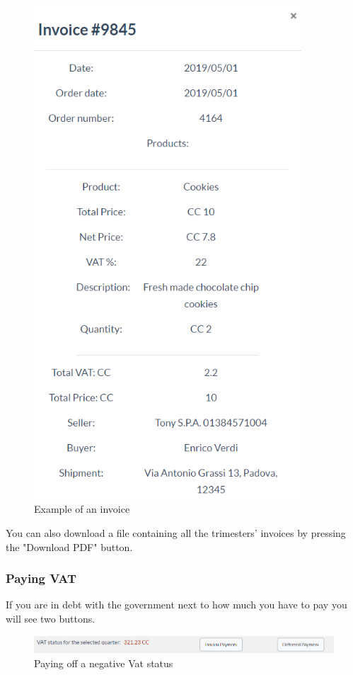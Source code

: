 	\begin{figure}[H]
		\includegraphics[width=10cm]{res/images/invoice_details.png}
		\centering
		\caption{Example of an invoice}
	\end{figure}
	\noindent You can also download a file containing all the trimesters'
	invoices by pressing the "Download PDF" button. 
		\subsubsection{Paying VAT}
		If you are in debt with the government next to how much you have to 
		pay you will see two buttons.
		\begin{figure}[H]
			\includegraphics[width=15cm]{res/images/paying_vat.png}
			\centering
			\caption{Paying off a negative Vat status}
		\end{figure}
